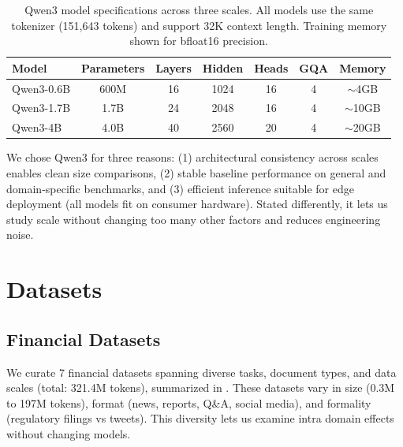 \begin{table}[h]
\centering
\caption[Qwen3 Model Specifications]{Qwen3 model specifications across three scales. All models use the same tokenizer (151,643 tokens) and support 32K context length. Training memory shown for bfloat16 precision.}
\label{tab:model_specs}
\begin{tabular}{lcccccc}
\toprule
\textbf{Model} & \textbf{Parameters} & \textbf{Layers} & \textbf{Hidden} & \textbf{Heads} & \textbf{GQA} & \textbf{Memory} \\
\midrule
Qwen3-0.6B & 600M & 16 & 1024 & 16 & 4 & $\sim$4GB \\
Qwen3-1.7B & 1.7B & 24 & 2048 & 16 & 4 & $\sim$10GB \\
Qwen3-4B & 4.0B & 40 & 2560 & 20 & 4 & $\sim$20GB \\
\bottomrule
\end{tabular}
\end{table}

We chose Qwen3 for three reasons: (1) architectural consistency across scales enables clean size comparisons, (2) stable baseline performance on general and domain‑specific benchmarks, and (3) efficient inference suitable for edge deployment (all models fit on consumer hardware). Stated differently, it lets us study scale without changing too many other factors and reduces engineering noise.

\section{Datasets}

\subsection{Financial Datasets}

We curate 7 financial datasets spanning diverse tasks, document types, and data scales (total: 321.4M tokens), summarized in . These datasets vary in size (0.3M to 197M tokens), format (news, reports, Q\&A, social media), and formality (regulatory filings vs tweets). This diversity lets us examine intra domain effects without changing models.

